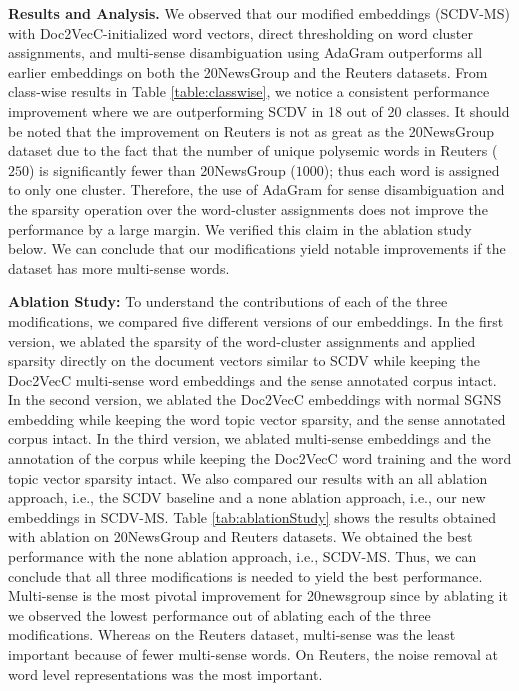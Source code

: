 \documentclass{ecai}
\begin{document}
\vspace{0.5em}
\noindent \textbf{Results and Analysis.} We observed that our modified embeddings (SCDV-MS) with Doc2VecC-initialized word vectors, direct thresholding on word cluster assignments, and multi-sense disambiguation using AdaGram outperforms all earlier embeddings on both the 20NewsGroup and the Reuters datasets. From class-wise results in Table \ref{table:classwise}, we notice a consistent performance improvement where we are outperforming SCDV in 18 out of 20 classes. It should be noted that the improvement on Reuters is not as great as the 20NewsGroup dataset due to the fact that the number of unique polysemic words in Reuters ($250$) is significantly fewer than 20NewsGroup ($1000$); thus each word is assigned to only one cluster. Therefore, the use of AdaGram for sense disambiguation and the sparsity operation over the word-cluster assignments does not improve the performance by a large margin. We verified this claim in the ablation study below. We can conclude that our modifications yield notable improvements if the dataset has more multi-sense words.

\vspace{0.5em}
\noindent \textbf{Ablation Study: } To understand the contributions of each of the three modifications, we compared five different versions of our embeddings. In the first version, we ablated the sparsity of the word-cluster assignments and applied sparsity directly on the document vectors similar to SCDV while keeping the Doc2VecC multi-sense word embeddings and the sense annotated corpus intact. In the second version, we ablated the Doc2VecC embeddings with normal SGNS embedding while keeping the word topic vector sparsity, and the sense annotated corpus intact. In the third version, we ablated multi-sense embeddings and the annotation of the corpus while keeping the Doc2VecC word training and the word topic vector sparsity intact. We also compared our results with an all ablation approach, i.e., the SCDV baseline and a none ablation approach, i.e., our new embeddings in SCDV-MS. Table \ref{tab:ablationStudy} shows the results obtained with ablation on 20NewsGroup and Reuters datasets. We obtained the best performance with the none ablation approach, i.e., SCDV-MS. Thus, we can conclude that all three modifications is needed to yield the best performance. Multi-sense is the most pivotal improvement for 20newsgroup since by ablating it we observed the lowest performance out of ablating each of the three modifications. Whereas on the Reuters dataset, multi-sense was the least important because of fewer multi-sense words. On Reuters, the noise removal at word level representations was the most important.
\end{document}
